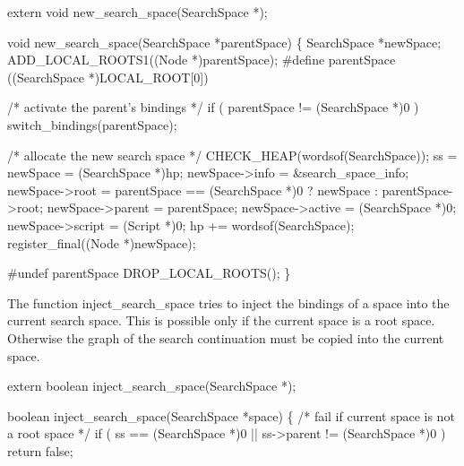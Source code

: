 \nwenddocs{}\plusendmoddef\nwstartdeflinemarkup{}\nwenddeflinemarkup
extern void new_search_space(SearchSpace *);

\nwendcode{}\nwdocspar
\nwenddocs{}\plusendmoddef\nwstartdeflinemarkup{}\nwenddeflinemarkup
void
new_search_space(SearchSpace *parentSpace)
\{
    SearchSpace *newSpace;
    ADD_LOCAL_ROOTS1((Node *)parentSpace);
#define parentSpace ((SearchSpace *)LOCAL_ROOT[0])

    /* activate the parent's bindings */
    if ( parentSpace != (SearchSpace *)0 )
        switch_bindings(parentSpace);

    /* allocate the new search space */
    CHECK_HEAP(wordsof(SearchSpace));
    ss = newSpace    = (SearchSpace *)hp;
    newSpace->info   = &search_space_info;
    newSpace->root   =
        parentSpace == (SearchSpace *)0 ? newSpace : parentSpace->root;
    newSpace->parent = parentSpace;
    newSpace->active = (SearchSpace *)0;
    newSpace->script = (Script *)0;
    hp              += wordsof(SearchSpace);
    register_final((Node *)newSpace);

#undef parentSpace
    DROP_LOCAL_ROOTS();
\}

\nwendcode{}\nwdocspar
The function {\Tt{}inject{\_}search{\_}space\nwendquote} tries to inject the bindings of a
space into the current search space. This is possible only if the
current space is a root space. Otherwise the graph of the search
continuation must be copied into the current space.

\nwenddocs{}\plusendmoddef\nwstartdeflinemarkup{}\nwenddeflinemarkup
extern boolean inject_search_space(SearchSpace *);

\nwendcode{}\nwdocspar
\nwenddocs{}\plusendmoddef\nwstartdeflinemarkup{}\nwenddeflinemarkup
boolean
inject_search_space(SearchSpace *space)
\{
    /* fail if current space is not a root space */
    if ( ss == (SearchSpace *)0 || ss->parent != (SearchSpace *)0 )
        return false;

